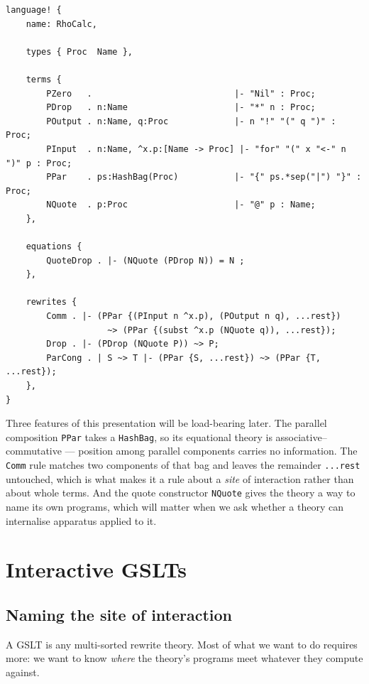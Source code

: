 \documentclass[11pt]{article}
\theoremstyle{definition}
\theoremstyle{plain}
\theoremstyle{remark}
\begin{document}
\begin{lstlisting}
language! {
    name: RhoCalc,

    types { Proc  Name },

    terms {
        PZero   .                            |- "Nil" : Proc;
        PDrop   . n:Name                     |- "*" n : Proc;
        POutput . n:Name, q:Proc             |- n "!" "(" q ")" : Proc;
        PInput  . n:Name, ^x.p:[Name -> Proc] |- "for" "(" x "<-" n ")" p : Proc;
        PPar    . ps:HashBag(Proc)           |- "{" ps.*sep("|") "}" : Proc;
        NQuote  . p:Proc                     |- "@" p : Name;
    },

    equations {
        QuoteDrop . |- (NQuote (PDrop N)) = N ;
    },

    rewrites {
        Comm . |- (PPar {(PInput n ^x.p), (POutput n q), ...rest})
                    ~> (PPar {(subst ^x.p (NQuote q)), ...rest});
        Drop . |- (PDrop (NQuote P)) ~> P;
        ParCong . | S ~> T |- (PPar {S, ...rest}) ~> (PPar {T, ...rest});
    },
}
\end{lstlisting}

Three features of this presentation will be load-bearing later. The parallel composition
\texttt{PPar} takes a \texttt{HashBag}, so its equational theory is
associative--commutative --- position among parallel components carries no information.
The \texttt{Comm} rule matches two components of that bag and leaves the remainder
\texttt{...rest} untouched, which is what makes it a rule about a \emph{site} of
interaction rather than about whole terms. And the quote constructor \texttt{NQuote}
gives the theory a way to name its own programs, which will matter when we ask whether a
theory can internalise apparatus applied to it.

\section{Interactive GSLTs}
\label{sec:interactive}

\subsection{Naming the site of interaction}

A GSLT is any multi-sorted rewrite theory. Most of what we want to do requires more:
we want to know \emph{where} the theory's programs meet whatever they compute against.
\end{document}
